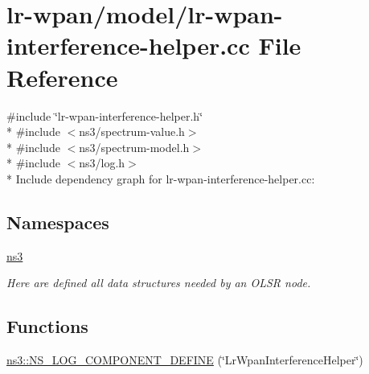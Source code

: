 \hypertarget{lr-wpan-interference-helper_8cc}{}\section{lr-\/wpan/model/lr-\/wpan-\/interference-\/helper.cc File Reference}
\label{lr-wpan-interference-helper_8cc}
{\ttfamily \#include \char`\"{}lr-\/wpan-\/interference-\/helper.\+h\char`\"{}}\\*
{\ttfamily \#include $<$ns3/spectrum-\/value.\+h$>$}\\*
{\ttfamily \#include $<$ns3/spectrum-\/model.\+h$>$}\\*
{\ttfamily \#include $<$ns3/log.\+h$>$}\\*
Include dependency graph for lr-\/wpan-\/interference-\/helper.cc\+:
\subsection*{Namespaces}
\begin{DoxyCompactItemize}
\item 
 \hyperlink{namespacens3}{ns3}
\begin{DoxyCompactList}\small\item\em Here are defined all data structures needed by an O\+L\+SR node. \end{DoxyCompactList}\end{DoxyCompactItemize}
\subsection*{Functions}
\begin{DoxyCompactItemize}
\item 
\hyperlink{namespacens3_a86ba9d05dc4fd8557bdef1526f8ea15a}{ns3\+::\+N\+S\+\_\+\+L\+O\+G\+\_\+\+C\+O\+M\+P\+O\+N\+E\+N\+T\+\_\+\+D\+E\+F\+I\+NE} (\char`\"{}Lr\+Wpan\+Interference\+Helper\char`\"{})
\end{DoxyCompactItemize}
